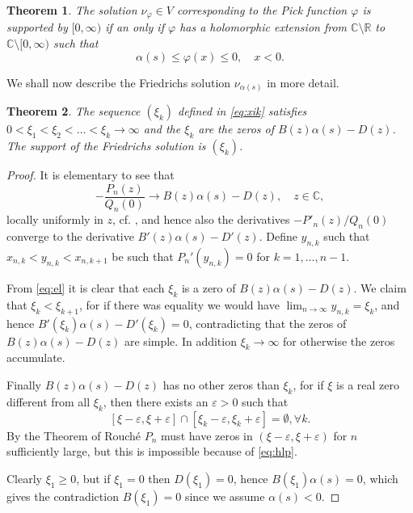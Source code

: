 \documentclass[12pt]{article}
\newtheorem{thm}{Theorem}[section]
\newcommand{\C}{\mathbb{C}}
\newcommand{\R}{\mathbb{R}}
\def\C{\mathbb{C}}
\def\R{\mathbb{R}}
\begin{document}
\begin{thm}\cite{Pe2}\label{thm:Ped} The solution $\nu_\varphi\in V$ corresponding to the Pick function $\varphi$ is supported by $[0,\infty)$ if an only if $\varphi$ has a holomorphic extension from $\C\setminus\R$ to $\C\setminus [0,\infty)$ such that 
$$
\alpha(s)\le \varphi(x)\le 0,\quad x<0.
$$
\end{thm}

We shall now describe the Friedrichs solution $\nu_{\alpha(s)}$ in more detail.



\begin{thm}\label{thm:Fr1} The sequence $(\xi_k)$ defined in \eqref{eq:xik} satisfies $0<\xi_1<\xi_2<\ldots<\xi_k\to\infty$ and the $\xi_k$  are the zeros of $B(z)\alpha(s)-D(z)$. The support of the Friedrichs solution is $(\xi_k)$.
\end{thm}

\begin{proof} It is elementary to see that
\begin{equation}\label{eq:el}
-\frac{P_n(z)}{Q_n(0)}\to B(z)\alpha(s)-D(z),\quad z\in\C,
\end{equation}
locally uniformly in $z$, cf. \cite[Equation (8)]{Pe1}, and hence also the derivatives $-P'_n(z)/Q_n(0)$ converge to the derivative $B'(z)\alpha(s)-D'(z)$. Define $y_{n,k}$ such that  $x_{n,k}<y_{n,k}<x_{n,k+1}$ be such that $P_n'(y_{n,k})=0$ for $k=1,\ldots,n-1$.

From \eqref{eq:el} it is clear that each $\xi_k$ is a zero of 
$B(z)\alpha(s)-D(z)$. We claim that $\xi_k<\xi_{k+1}$, for if there was equality we would have $\lim_{n\to\infty}y_{n,k}=\xi_k$, and hence $B'(\xi_k)\alpha(s)-D'(\xi_k)=0$, contradicting that the zeros of $B(z)\alpha(s)-D(z)$ are simple.  In addition $\xi_k\to\infty$ for otherwise the zeros accumulate. 

Finally $B(z)\alpha(s)-D(z)$ has no other zeros than $\xi_k$, for if $\xi$ is a real zero different from all $\xi_k$, then there exists an $\varepsilon>0$ such that
\begin{equation}\label{eq:hlp}
[\xi-\varepsilon,\xi+\varepsilon]\cap [\xi_k-\varepsilon,\xi_k+\varepsilon]=\emptyset, \forall k.
\end{equation}
By the Theorem of Rouch\'e $P_n$ must have zeros in $(\xi-\varepsilon,\xi+\varepsilon)$ for $n$ sufficiently large, but this is impossible because of \eqref{eq:hlp}. 

Clearly $\xi_1\ge 0$, but if $\xi_1=0$ then $D(\xi_1)=0$, hence $B(\xi_1)\alpha(s)=0$, which gives the contradiction $B(\xi_1)=0$ since we assume $\alpha(s)<0$.
\end{proof}
\end{document}
